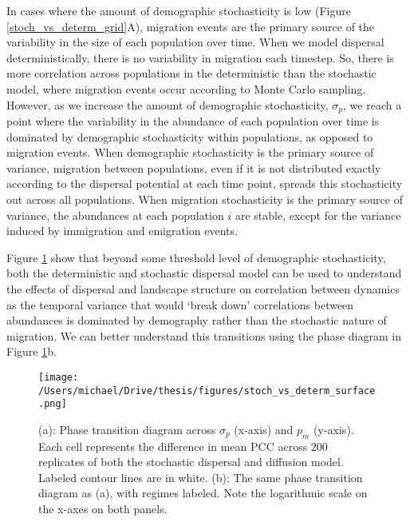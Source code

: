 In cases where the amount of demographic stochasticity is low (Figure
\ref{stoch_vs_determ_grid}A), migration events are the primary source of
the variability in the size of each population over time. When we model
dispersal deterministically, there is no variability in migration each
timestep. So, there is more correlation across populations in the
deterministic than the stochastic model, where migration events occur
according to Monte Carlo sampling. However, as we increase the amount of
demographic stochasticity, \(\sigma_p\), we reach a point where the
variability in the abundance of each population over time is dominated
by demographic stochasticity within populations, as opposed to migration
events. When demographic stochasticity is the primary source of
variance, migration between populations, even if it is not distributed
exactly according to the dispersal potential at each time point, spreads
this stochasticity out across all populations. When migration
stochasticity is the primary source of variance, the abundances at each
population \(i\) are stable, except for the variance induced by
immigration and emigration events.

Figure \ref{stoch_vs_determ_surface} show that beyond some threshold
level of demographic stochasticity, both the deterministic and
stochastic dispersal model can be used to understand the effects of
dispersal and landscape structure on correlation between dynamics as the
temporal variance that would `break down' correlations between
abundances is dominated by demography rather than the stochastic nature
of migration. We can better understand this transitions using the phase
diagram in Figure \ref{stoch_vs_determ_surface}b.

\begin{figure}[h]

\texttt{[image: /Users/michael/Drive/thesis/figures/stoch\_vs\_determ\_surface.png]}

\caption{(a): Phase transition diagram across $\sigma_p$ (x-axis) and $p_m$ (y-axis). Each cell represents the difference in mean PCC across $200$ replicates of both the stochastic dispersal and diffusion model. Labeled contour lines are in white. (b): The same phase transition diagram as (a), with regimes labeled. Note the logarithmic scale on the x-axes on both panels.}

\label{stoch_vs_determ_surface}

\end{figure}

\pagebreak

